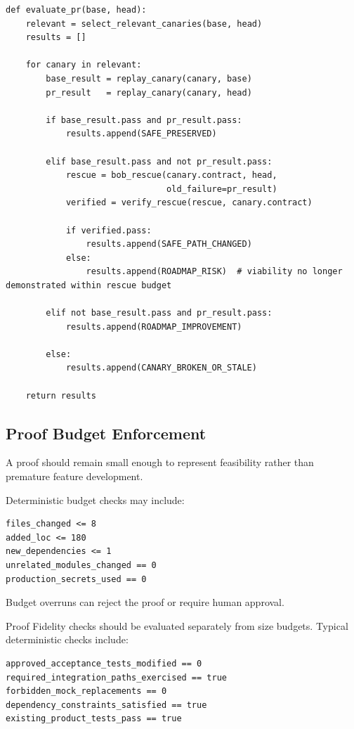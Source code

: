 \documentclass[12pt]{article}
\begin{document}
\begin{lstlisting}
def evaluate_pr(base, head):
    relevant = select_relevant_canaries(base, head)
    results = []

    for canary in relevant:
        base_result = replay_canary(canary, base)
        pr_result   = replay_canary(canary, head)

        if base_result.pass and pr_result.pass:
            results.append(SAFE_PRESERVED)

        elif base_result.pass and not pr_result.pass:
            rescue = bob_rescue(canary.contract, head,
                                old_failure=pr_result)
            verified = verify_rescue(rescue, canary.contract)

            if verified.pass:
                results.append(SAFE_PATH_CHANGED)
            else:
                results.append(ROADMAP_RISK)  # viability no longer demonstrated within rescue budget

        elif not base_result.pass and pr_result.pass:
            results.append(ROADMAP_IMPROVEMENT)

        else:
            results.append(CANARY_BROKEN_OR_STALE)

    return results
\end{lstlisting}

\subsection{Proof Budget Enforcement}

A proof should remain small enough to represent feasibility rather than premature feature development.

Deterministic budget checks may include:

\begin{lstlisting}
files_changed <= 8
added_loc <= 180
new_dependencies <= 1
unrelated_modules_changed == 0
production_secrets_used == 0
\end{lstlisting}

Budget overruns can reject the proof or require human approval.

Proof Fidelity checks should be evaluated separately from size budgets. Typical deterministic checks include:

\begin{lstlisting}
approved_acceptance_tests_modified == 0
required_integration_paths_exercised == true
forbidden_mock_replacements == 0
dependency_constraints_satisfied == true
existing_product_tests_pass == true
\end{lstlisting}
\end{document}
